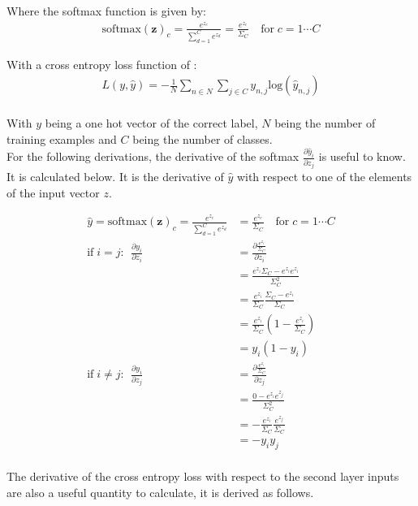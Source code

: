 \documentclass[]{article}
\begin{document}
Where the softmax function is given by:
\begin{align*}
\text{softmax}(\mathbf{z})_c = \frac{e^{z_c}}{\sum_{d=1}^C e^{z_d}} = \frac{e^{z_c}}{ \Sigma_C }\quad \text{for} \; c = 1 \cdots C
\end{align*}

With a cross entropy loss function of :
\begin{align*}
L(y,\hat{y}) = -  \frac{1}{N} \sum_{n \in N} \sum_{j\in C} y_{n,j} \text{log}(\hat{y}_{n,j} ) \\
\end{align*}

With $y$ being a one hot vector of the correct label, $N$ being the number of training examples and $C$ being the number of classes. \\

For the following derivations, the derivative of the softmax $\frac{\partial \hat{y}_i}{\partial z_j}$ is useful to know. It is calculated below. It is the derivative of $\hat{y}$ with respect to one of the elements of the input vector $z$.

\begin{align*}
\hat{y} = \text{softmax}(\mathbf{z})_c = \frac{e^{z_c}}{\sum_{d=1}^C e^{z_d}} &= \frac{e^{z_c}}{ \Sigma_C }\quad \text{for} \; c = 1 \cdots C \\
\text{if} \; i = j :~~ \frac{\partial y_i}{\partial z_i} &= \frac{\partial \frac{e^{z_i}}{\Sigma_C}}{\partial z_i} \\
&= \frac{e^{z_i}\Sigma_C - e^{z_i}e^{z_i}}{\Sigma_C^2} \\ 
&= \frac{e^{z_i}}{\Sigma_C}\frac{\Sigma_C - e^{z_i}}{\Sigma_C}  \\
&= \frac{e^{z_i}}{\Sigma_C}(1-\frac{e^{z_i}}{\Sigma_C}) \\
&=  y_i (1 - y_i) \\
\text{if} \; i \neq j :~~ \frac{\partial y_i}{\partial z_j} &= \frac{\partial \frac{e^{z_i}}{\Sigma_C}}{\partial z_j} \\ 
&= \frac{0 - e^{z_i}e^{z_j}}{\Sigma_C^2} \\
&= -\frac{e^{z_i}}{\Sigma_C} \frac{e^{z_j}}{\Sigma_C} \\
&= -y_i y_j \\
\end{align*}


The derivative of the cross entropy loss with respect to the second layer inputs are also a useful quantity to calculate, it is derived as follows.
\end{document}
